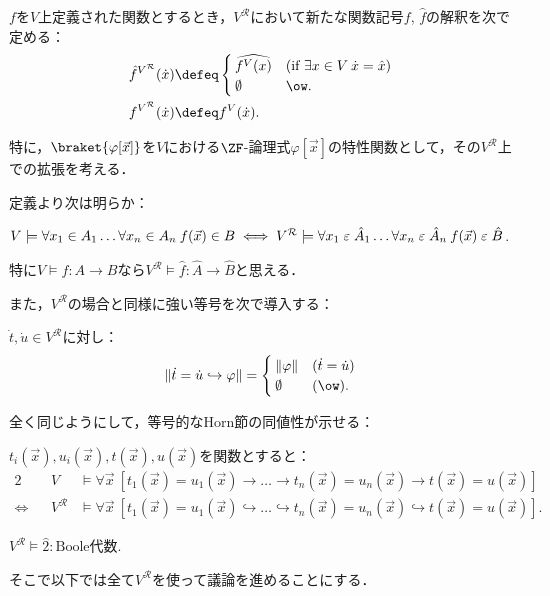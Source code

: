 \documentclass[realisability.tex]{subfiles}
\begin{document}
\begin{definition}
 $f$を$V$上定義された関数とするとき，$V^{\mathcal{R}}$において新たな関数記号$f$, $\hat{f}$の解釈を次で定める： 
 \begin{align*}
  \hat{f}^{V^{\mathcal{R}}}(\dot{x}) &\defeq
  \begin{cases}
   \widehat{f^V(x)} & (\text{if } \exists x \in V \: \dot{x} = \hat{x})\\
   \emptyset & \ow.
  \end{cases}\\
  f^{V^{\mathcal{R}}}(\dot{x}) &\defeq f^V(\dot{x}).
 \end{align*} 

 特に，$\braket{\varphi[\vec{x}]}$を$V$における$\ZF$-論理式$\varphi[\vec{x}]$の特性関数として，その$V^{\mathcal{R}}$上での拡張を考える．
\end{definition}
定義より次は明らか：
\begin{lemma}
 $V \models \forall x_1 \in A_1 \dots \forall x_n \in A_n \: f(\vec{x}) \in B \iff V^{\mathcal{R}} \models \forall x_1 \mathrel{\varepsilon} \hat{A}_1 \dots \forall x_n \mathrel{\varepsilon} \hat{A}_n \: f(\vec{x}) \mathrel{\varepsilon} \hat{B}$.

 特に$V \models f: A \to B$なら$V^{\mathcal{R}} \models \hat{f}: \hat{A} \to \hat{B}$と思える．
\end{lemma}
また，$V^{\mathcal{R}}$の場合と同様に強い等号を次で導入する：
\begin{definition}
 $\dot{t}, \dot{u} \in V^{\mathcal{R}}$に対し：
 \[
 \|\dot{t} = \dot{u} \hookrightarrow \varphi \| =
 \begin{cases}
  \|\varphi\| & (\dot{t} = \dot{u})\\
  \emptyset & (\ow).
 \end{cases}
 \]
\end{definition}
全く同じようにして，等号的なHorn節の同値性が示せる：
\begin{lemma}
 $t_i(\vec{x}), u_i(\vec{x}), t(\vec{x}), u(\vec{x})$を関数とすると：
 \begin{alignat*}{2}
  &&V &\models \forall \vec{x}\:\left[t_1(\vec{x}) = u_1(\vec{x}) \to \dots \to t_n(\vec{x}) = u_n(\vec{x}) \to t(\vec{x}) = u(\vec{x})\right]\\
 \iff
 &&V^{\mathcal{R}} &\models \forall \vec{x}\:\left[t_1(\vec{x}) = u_1(\vec{x}) \hookrightarrow \dots \hookrightarrow t_n(\vec{x}) = u_n(\vec{x}) \hookrightarrow t(\vec{x}) = u(\vec{x})\right].
 \end{alignat*}
\end{lemma}
\begin{corollary}
 $V^{\mathcal{R}} \models \hat{2}: \text{Boole代数}$.
\end{corollary}
そこで以下では全て$V^{\mathcal{R}}$を使って議論を進めることにする．
\end{document}
